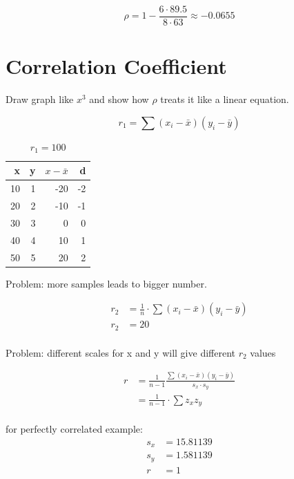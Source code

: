 \documentclass[landscape]{exam}
\begin{document}
  \[
    \rho = 1 - \frac{6 \cdot 89.5}{8 \cdot 63} \approx -0.0655
  \]
  
  \section{Correlation Coefficient}

  Draw graph like $x^3$ and show how $\rho$ treats it like a linear equation.

  \[
    r_1 = \sum (x_i - \bar{x})(y_i - \bar{y})
  \]

  \begin{table}
    \centering
    \begin{tabular}{rrrr}
      \toprule
      x  & y & $x - \bar{x}$ & d \\
      \midrule
      10 & 1 & -20           & -2 \\
      20 & 2 & -10           & -1 \\
      30 & 3 & 0             & 0 \\
      40 & 4 & 10            & 1 \\
      50 & 5 & 20            & 2 \\
      \bottomrule
    \end{tabular}
    \caption{$r_1 = 100$}
  \end{table}

  Problem: more samples leads to bigger number.

  \begin{align*}
    r_2 &= \frac{1}{n} \cdot \sum (x_i - \bar{x})(y_i - \bar{y}) \\
    r_2 &= 20 \\
  \end{align*}

  Problem: different scales for x and y will give different $r_2$ values

  \begin{align*}
    r   & = \frac{1}{n - 1} \frac{\sum (x_i - \bar{x})(y_i - \bar{y})}{s_x \cdot s_y} \\
        & = \frac{1}{n - 1} \cdot \sum z_x z_y \\
  \end{align*}

  for perfectly correlated example:
  \begin{align*}
    s_x & = 15.81139 \\
    s_y & = 1.581139 \\
    r   & = 1 \\
  \end{align*}
\end{document}
